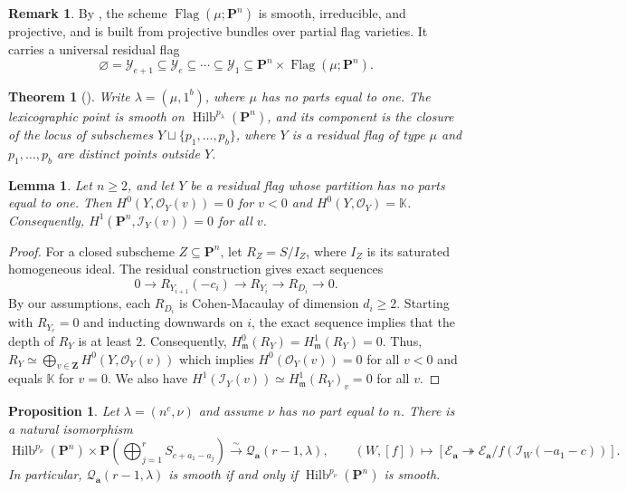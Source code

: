 \documentclass[leqno,11pt,a4paper]{amsart}
\newtheorem{thm}{Theorem}[section]
\newtheorem{lemma}[lemma]{Lemma}
\newtheorem{prop}[prop]{Proposition}
\theoremstyle{definition}
\newtheorem{remark}[remark]{Remark}
\numberwithin{equation}{section}
\newcommand{\kk}{\mathbb{K}}
\newcommand{\bfa}{\mathbf{a}}
\newcommand{\PP}{\mathbf{P}}
\newcommand{\mfm}{\mathfrak{m}}
\newcommand{\EE}{\mathscr{E}}
\newcommand{\OO}{\mathscr{O}}
\newcommand{\II}{\mathscr{I}}
\newcommand{\QQ}{\mathcal{Q}}
\DeclareMathOperator{\Hilb}{Hilb}
\DeclareMathOperator{\Flag}{Flag}
\begin{document}
\begin{remark} \label{universal_flag}
By \cite[Proposition~1.11]{SS23}, the scheme $\Flag(\mu;\PP^n)$ is smooth, irreducible, and projective,
and is built from projective bundles over partial flag varieties. It carries a universal residual flag
$$
\varnothing=\mathcal Y_{e+1}\subseteq\mathcal Y_e
\subseteq\cdots\subseteq\mathcal Y_1
\subseteq\PP^n\times\Flag(\mu;\PP^n).
$$
\end{remark}

\begin{thm}[{\cite[Theorems~1.4 and~4.1]{RS97}}]\label{hilbert_lex}
Write $\lambda=(\mu,1^b)$, where $\mu$ has no parts equal to one. 
The lexicographic point is smooth on $\Hilb^{p_\lambda}(\PP^n)$, and its component is the closure
of the locus of subschemes $Y\sqcup\{p_1,\ldots,p_b\}$, where $Y$ is a residual flag of type $\mu$ and $p_1,\ldots,p_b$ are distinct points outside $Y$.
\end{thm}

\begin{lemma}\label{negative_cohomology}
Let $n\geq 2$, and let $Y$ be a residual flag whose partition has no parts equal to one. 
Then $H^0(Y,\OO_Y(v))=0$ for $v<0$ and $H^0(Y,\OO_Y)=\kk$. Consequently, $H^1(\PP^n, \II_Y(v))=0$ for all $v$. 
\end{lemma}
\begin{proof}
For a closed subscheme $Z\subseteq\PP^n$, let $R_Z=S/I_Z$, where $I_Z$ is its saturated homogeneous ideal.
The residual construction gives exact sequences
$$
0\longrightarrow R_{Y_{i+1}}(-c_i) \longrightarrow R_{Y_i}\longrightarrow R_{D_i} \longrightarrow 0.
$$
By our assumptions, each $R_{D_i}$ is Cohen-Macaulay of dimension $d_i \geq 2$. 
Starting with $R_{Y_e} = 0$ and inducting downwards on $i$, the exact sequence implies that the depth of $R_Y$ is at least $2$.
Consequently, $H^0_{\mfm}(R_Y)= H^1_{\mfm}(R_Y)=0$.
Thus, $R_Y\simeq\bigoplus_{v\in\mathbf Z}H^0(Y,\OO_Y(v))$ which implies $H^0(\OO_Y(v))=0$ for all $v < 0$ and equals $\kk$ for $v=0$.
We also have $H^1(\II_Y(v))\simeq H^1_{\mfm}(R_Y)_v=0$ for all $v$. 
\end{proof}


\begin{prop} \label{P1_trivial}
Let $\lambda=(n^c,\nu)$ and assume $\nu$ has no part equal to $n$.
There is a natural isomorphism
$$
\Hilb^{p_\nu}(\PP^n)\times \PP\left(\bigoplus_{j=1}^r S_{c+a_1-a_j}\right) \xrightarrow{\ \sim\ } \QQ_{\bfa}(r-1,\lambda),
\qquad
(W,[f]) \mapsto \left[\EE_{\bfa}\twoheadrightarrow \EE_{\bfa}/f(\II_W(-a_1-c))\right].
$$
In particular, $\QQ_{\bfa}(r-1,\lambda)$ is smooth if and only if $\Hilb^{p_\nu}(\PP^n)$ is smooth.
\end{prop}
\end{document}
